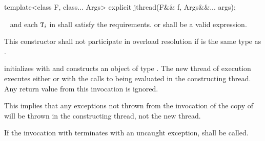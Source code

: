 %
\begin{itemdecl}
template<class F, class... Args> explicit jthread(F&& f, Args&&... args);
\end{itemdecl}
\begin{itemdescr}
  \pnum
\requires\  and each $\texttt{T}_i$ in  shall satisfy the
 requirements.
{\color{diffcolor} or
}
 shall be a valid expression.

\pnum\remarks
This constructor shall not participate in overload resolution if 
is the same type as .

\pnum\effects
{\color{diffcolor} initializes  with  and
}
constructs an object of type . The new thread of execution executes
either 
{\color{diffcolor}
or
}
with the calls to
 being evaluated in the constructing thread.
Any return value from this invocation is ignored.
\begin{note} This implies that any exceptions not thrown from the invocation of the copy
of  will be thrown in the constructing thread, not the new thread. \end{note}
If the invocation
with 
terminates with an uncaught exception,  shall be called.


\end{itemdescr}
